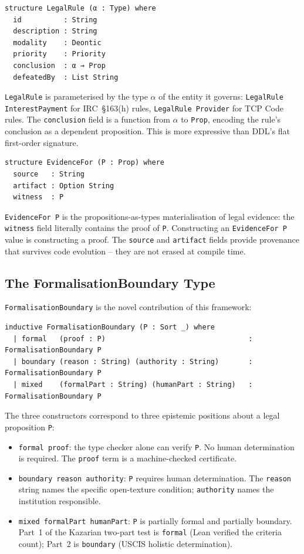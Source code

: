 \documentclass[runningheads]{llncs}
\begin{document}
\begin{lstlisting}[language=lean4]
structure LegalRule (α : Type) where
  id          : String
  description : String
  modality    : Deontic
  priority    : Priority
  conclusion  : α → Prop
  defeatedBy  : List String
\end{lstlisting}

\texttt{LegalRule} is parameterised by the type \texttt{\(\alpha\)} of the
entity it governs: \texttt{LegalRule InterestPayment} for IRC~\S163(h) rules,
\texttt{LegalRule Provider} for TCP Code rules. The \texttt{conclusion} field is
a function from \texttt{\(\alpha\)} to \texttt{Prop}, encoding the rule's
conclusion as a dependent proposition. This is more expressive than DDL's flat
first-order signature.

\begin{lstlisting}[language=lean4]
structure EvidenceFor (P : Prop) where
  source   : String
  artifact : Option String
  witness  : P
\end{lstlisting}

\texttt{EvidenceFor P} is the propositions-as-types materialisation of legal
evidence: the \texttt{witness} field literally contains the proof of \texttt{P}.
Constructing an \texttt{EvidenceFor P} value is constructing a proof. The
\texttt{source} and \texttt{artifact} fields provide provenance that survives
code evolution -- they are not erased at compile time.

\subsection{The FormalisationBoundary Type}

\texttt{FormalisationBoundary} is the novel contribution of this framework:

\begin{lstlisting}[language=lean4]
inductive FormalisationBoundary (P : Sort _) where
  | formal   (proof : P)                                  : FormalisationBoundary P
  | boundary (reason : String) (authority : String)       : FormalisationBoundary P
  | mixed    (formalPart : String) (humanPart : String)   : FormalisationBoundary P
\end{lstlisting}

The three constructors correspond to three epistemic positions about a legal
proposition \texttt{P}:

\begin{itemize}
  \item \texttt{formal proof}: the type checker alone can verify \texttt{P}. No
    human determination is required. The \texttt{proof} term is a
    machine-checked certificate.
  \item \texttt{boundary reason authority}: \texttt{P} requires human
    determination. The \texttt{reason} string names the specific open-texture
    condition; \texttt{authority} names the institution responsible.
  \item \texttt{mixed formalPart humanPart}: \texttt{P} is partially formal and
    partially boundary. Part~1 of the Kazarian two-part test is \texttt{formal}
    (Lean verified the criteria count); Part~2 is \texttt{boundary} (USCIS
    holistic determination).
\end{itemize}
\end{document}

